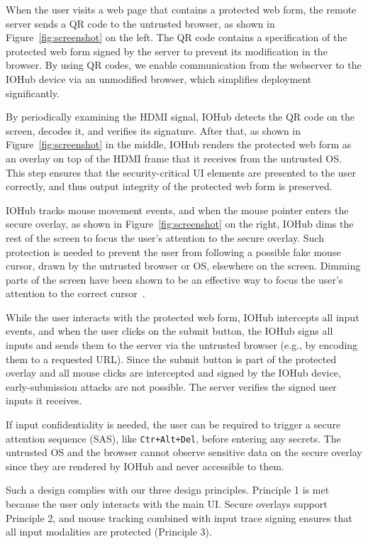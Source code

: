 \documentclass[letterpaper,twocolumn,10pt]{article}
\newcommand{\hub}{\textsf{IOHub}\xspace}
\begin{document}
When the user visits a web page that contains a protected web form, the remote server sends a QR code to the untrusted browser, as shown in Figure~\ref{fig:screenshot} on the left. The QR code contains a specification of the protected web form signed by the server to prevent its modification in the browser. By using QR codes, we enable communication from the webserver to the \hub device via an unmodified browser, which simplifies deployment significantly.

By periodically examining the HDMI signal, \hub detects the QR code on the screen, decodes it, and verifies its signature. After that, as shown in Figure~\ref{fig:screenshot} in the middle, \hub renders the protected web form as an overlay on top of the HDMI frame that it receives from the untrusted OS. This step ensures that the security-critical UI elements are presented to the user correctly, and thus output integrity of the protected web form is preserved.

\hub tracks mouse movement events, and when the mouse pointer enters the secure overlay, as shown in Figure~\ref{fig:screenshot} on the right, \hub dims the rest of the screen to focus the user's attention to the secure overlay. Such protection is needed to prevent the user from following a possible fake mouse cursor, drawn by the untrusted browser or OS, elsewhere on the screen. Dimming parts of the screen have been shown to be an effective way to focus the user's attention to the correct cursor~\cite{huang2012clickjacking}.

While the user interacts with the protected web form, \hub intercepts all input events, and when the user clicks on the submit button, the \hub signs all inputs and sends them to the server via the untrusted browser (e.g., by encoding them to a requested URL). Since the submit button is part of the protected overlay and all mouse clicks are intercepted and signed by the \hub device, early-submission attacks are not possible. The server verifies the signed user inputs it receives. 

If input confidentiality is needed, the user can be required to trigger a secure attention sequence (SAS), like \texttt{Ctr+Alt+Del}, before entering any secrets. The untrusted OS and the browser cannot observe sensitive data on the secure overlay since they are rendered by \hub and never accessible to them.

Such a design complies with our three design principles. Principle 1 is met because the user only interacts with the main UI. Secure overlays support Principle 2, and mouse tracking combined with input trace signing ensures that all input modalities are protected (Principle 3).
\end{document}
